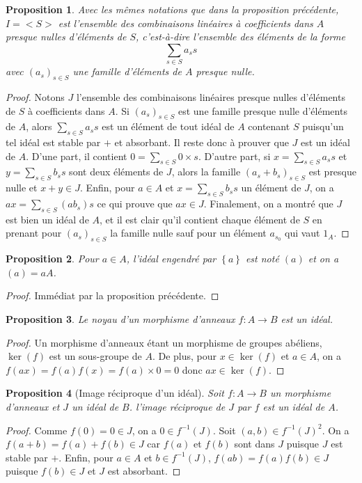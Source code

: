 \documentclass[french]{book}
\newcommand{\inv}{^{-1}}
\theoremstyle{plain}
\newtheorem{prop}{Proposition}[chapter]
\theoremstyle{definition}
\theoremstyle{remark}
\begin{document}
\begin{prop}
	Avec les mêmes notations que dans la proposition précédente, $I=<S>$ est l'ensemble des combinaisons linéaires à coefficients dans $A$ presque nulles d'éléments de $S$, c'est-à-dire l'ensemble des éléments de la forme $$\sum_{s\in S}a_ss$$ avec $(a_s)_{s\in S}$ une famille d'éléments de $A$ presque nulle.
\end{prop}
\begin{proof}
	Notons $J$ l'ensemble des combinaisons linéaires presque nulles d'éléments de $S$ à coefficients dans $A$. Si $(a_s)_{s\in S}$ est une famille presque nulle d'éléments de $A$, alors $\displaystyle\sum_{s\in S}a_ss$ est un élément de tout idéal de $A$ contenant $S$ puisqu'un tel idéal est stable par $+$ et absorbant. Il reste donc à prouver que $J$ est un idéal de $A$. D'une part, il contient $0=\displaystyle\sum_{s\in S}0\times s$. D'autre part, si $x=\displaystyle\sum_{s\in S}a_ss$ et  $y=\displaystyle\sum_{s\in S}b_ss$ sont deux éléments de $J$, alors la famille $(a_s+b_s)_{s\in S}$ est presque nulle et $x+y\in J$. Enfin, pour $a\in A$ et $x=\displaystyle\sum_{s\in S}b_ss$ un élément de $J$, on a $ax=\displaystyle\sum_{s\in S}(ab_s)s$ ce qui prouve que $ax \in J$. Finalement, on a montré que $J$ est bien un idéal de $A$, et il est clair qu'il contient chaque élément de $S$ en prenant pour $(a_s)_{s\in S}$ la famille nulle sauf pour un élément $a_{s_0}$ qui vaut $1_A$.
\end{proof}
\begin{prop}
	Pour $a\in A$, l'idéal engendré par $\left\{a\right\}$ est noté $(a)$ et on a $(a)=aA$.
\end{prop}
\begin{proof}
	Immédiat par la proposition précédente.
\end{proof}
\begin{prop}
	Le noyau d'un morphisme d'anneaux $f:A\rightarrow B$ est un idéal.
\end{prop}
\begin{proof}
	Un morphisme d'anneaux étant un morphisme de groupes abéliens, $\ker(f)$ est un sous-groupe de $A$. De plus, pour $x\in\ker(f)$ et $a\in A$, on a $f(ax)=f(a)f(x)=f(a)\times 0=0$ donc $ax\in\ker(f)$.
\end{proof}
\begin{prop}[Image réciproque d'un idéal]
	Soit $f:A\rightarrow B$ un morphisme d'anneaux et $J$ un idéal de $B$. l'image réciproque de $J$ par $f$ est un idéal de $A$.
\end{prop}
\begin{proof}
	Comme $f(0)=0\in J$, on a $0\in f\inv(J)$. Soit $(a,b)\in f\inv(J)^2$. On a $f(a+b)=f(a)+f(b)\in J$ car $f(a)$ et $f(b)$ sont dans $J$ puisque $J$ est stable par $+$. Enfin, pour $a\in A$ et $b\in f\inv(J)$, $f(ab)=f(a)f(b)\in J$ puisque $f(b)\in J$ et $J$ est absorbant.
\end{proof}
\end{document}
